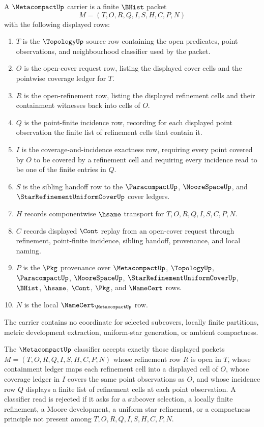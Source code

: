 \begin{definition}
\label{def:metacompact-open-cover-carrier}
A $\MetacompactUp$ carrier is a finite $\BHist$ packet
$$
M=(T,O,R,Q,I,S,H,C,P,N)
$$
with the following displayed rows:
\begin{enumerate}
\item $T$ is the $\TopologyUp$ source row containing the open predicates, point observations, and neighbourhood classifier used by the packet.
\item $O$ is the open-cover request row, listing the displayed cover cells and the pointwise coverage ledger for $T$.
\item $R$ is the open-refinement row, listing the displayed refinement cells and their containment witnesses back into cells of $O$.
\item $Q$ is the point-finite incidence row, recording for each displayed point observation the finite list of refinement cells that contain it.
\item $I$ is the coverage-and-incidence exactness row, requiring every point covered by $O$ to be covered by a refinement cell and requiring every incidence read to be one of the finite entries in $Q$.
\item $S$ is the sibling handoff row to the $\ParacompactUp$, $\MooreSpaceUp$, and $\StarRefinementUniformCoverUp$ cover ledgers.
\item $H$ records componentwise $\hsame$ transport for $T,O,R,Q,I,S,C,P,N$.
\item $C$ records displayed $\Cont$ replay from an open-cover request through refinement, point-finite incidence, sibling handoff, provenance, and local naming.
\item $P$ is the $\Pkg$ provenance over $\MetacompactUp$, $\TopologyUp$, $\ParacompactUp$, $\MooreSpaceUp$, $\StarRefinementUniformCoverUp$, $\BHist$, $\hsame$, $\Cont$, $\Pkg$, and $\NameCert$ rows.
\item $N$ is the local $\NameCert_{\MetacompactUp}$ row.
\end{enumerate}
The carrier contains no coordinate for selected subcovers, locally finite partitions, metric development extraction, uniform-star generation, or ambient compactness.
\end{definition}

\begin{definition}
\label{def:metacompact-classifier}
The $\MetacompactUp$ classifier accepts exactly those displayed packets $M=(T,O,R,Q,I,S,H,C,P,N)$ whose refinement row $R$ is open in $T$, whose containment ledger maps each refinement cell into a displayed cell of $O$, whose coverage ledger in $I$ covers the same point observations as $O$, and whose incidence row $Q$ displays a finite list of refinement cells at each point observation. A classifier read is rejected if it asks for a subcover selection, a locally finite refinement, a Moore development, a uniform star refinement, or a compactness principle not present among $T,O,R,Q,I,S,H,C,P,N$.
\end{definition}

